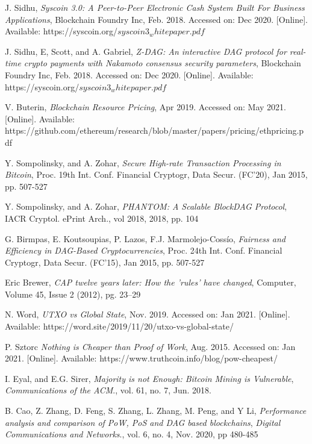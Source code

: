\documentclass[peerreview]{ieeesyscoin}
\begin{document}
\begin{thebibliography}{00}


 J. Sidhu, \textit{Syscoin 3.0: A Peer-to-Peer Electronic Cash System Built For Business Applications}, Blockchain Foundry Inc, Feb. 2018. Accessed on: Dec 2020. [Online]. Available: https://syscoin.org/$syscoin3_whitepaper.pdf$

 J. Sidhu, E, Scott, and A. Gabriel, \textit{Z-DAG: An interactive DAG protocol for real-time crypto payments with Nakamoto consensus security parameters}, Blockchain Foundry Inc, Feb. 2018. Accessed on: Dec 2020. [Online]. Available: https://syscoin.org/$syscoin3_whitepaper.pdf$

 V. Buterin,  \textit{Blockchain Resource Pricing}, Apr 2019. Accessed on: May 2021. [Online]. Available: https://github.com/ethereum/research/blob/master/papers/pricing/ethpricing.pdf

 Y. Sompolinsky, and A. Zohar, \textit{Secure High-rate Transaction Processing in Bitcoin}, Proc. 19th Int. Conf. Financial Cryptogr, Data Secur. (FC’20), Jan 2015, pp. 507-527

 Y. Sompolinsky, and A. Zohar, \textit{PHANTOM: A Scalable BlockDAG Protocol}, IACR Cryptol. ePrint Arch., vol 2018, 2018,  pp. 104

 G. Birmpas, E. Koutsoupias, P. Lazos, F.J. Marmolejo-Cossío, \textit{Fairness and Efficiency in DAG-Based Cryptocurrencies}, Proc. 24th Int. Conf. Financial Cryptogr, Data Secur. (FC’15), Jan 2015, pp. 507-527

 Eric Brewer, \textit{CAP twelve years later: How the 'rules' have changed}, Computer, Volume 45, Issue 2 (2012), pg. 23–29

 N. Word, \textit{UTXO vs Global State}, Nov. 2019. Accessed on: Jan 2021. [Online]. Available: https://word.site/2019/11/20/utxo-vs-global-state/

 P. Sztorc \textit{Nothing is Cheaper than Proof of Work}, Aug. 2015. Accessed on: Jan 2021. [Online]. Available: https://www.truthcoin.info/blog/pow-cheapest/

 I. Eyal, and E.G. Sirer, \textit{Majority is not Enough: Bitcoin Mining is Vulnerable}, \emph{Communications of the ACM}., vol. 61, no. 7, Jun. 2018.

 B. Cao, Z. Zhang, D. Feng, S. Zhang, L. Zhang, M. Peng, and
Y Li, \textit{Performance analysis and comparison of PoW, PoS and DAG based blockchains}, \emph{Digital Communications and Networks}., vol. 6, no. 4, Nov. 2020, pp 480-485


\end{thebibliography}
\end{document}
